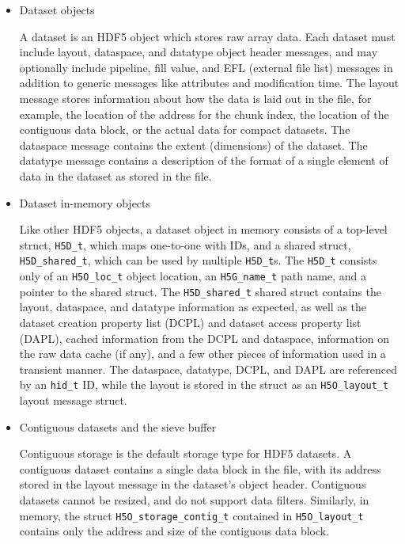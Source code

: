 \begin{itemize}
    \item Dataset objects

A dataset is an HDF5 object which stores raw array data. Each dataset must include layout, dataspace, and datatype object header messages, and may optionally include pipeline, fill value, and EFL (external file list) messages in addition to generic messages like attributes and modification time. The layout message stores information about how the data is laid out in the file, for example, the location of the address for the chunk index, the location of the contiguous data block, or the actual data for compact datasets. The dataspace message contains the extent (dimensions) of the dataset. The datatype message contains a description of the format of a single element of data in the dataset as stored in the file.

    \item Dataset in-memory objects

Like other HDF5 objects, a dataset object in memory consists of a top-level struct, \texttt{H5D\_t}, which maps one-to-one with IDs, and a shared struct, \texttt{H5D\_shared\_t}, which can be used by multiple \texttt{H5D\_t}s. The \texttt{H5D\_t} consists only of an \texttt{H5O\_loc\_t} object location, an \texttt{H5G\_name\_t} path name, and a pointer to the shared struct. The \texttt{H5D\_shared\_t} shared struct contains the layout, dataspace, and datatype information as expected, as well as the dataset creation property list (DCPL) and dataset access property list (DAPL), cached information from the DCPL and dataspace, information on the raw data cache (if any), and a few other pieces of information used in a transient manner. The dataspace, datatype, DCPL, and DAPL are referenced by an \texttt{hid\_t} ID, while the layout is stored in the struct as an \texttt{H5O\_layout\_t} layout message struct.

    \item Contiguous datasets and the sieve buffer

Contiguous storage is the default storage type for HDF5 datasets. A contiguous dataset contains a single data block in the file, with its address stored in the layout message in the dataset's object header. Contiguous datasets cannot be resized, and do not support data filters. Similarly, in memory, the struct \texttt{H5O\_storage\_contig\_t} contained in \texttt{H5O\_layout\_t} contains only the address and size of the contiguous data block.


\end{itemize}
